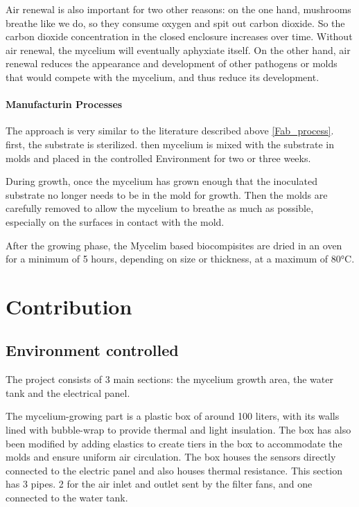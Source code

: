 Air renewal is also important for two other reasons: on the one hand, mushrooms breathe like we do, so they consume oxygen and spit out carbon dioxide. So the carbon dioxide concentration in the closed enclosure increases over time. Without air renewal, the mycelium will eventually aphyxiate itself. 
On the other hand, air renewal reduces the appearance and development of other pathogens or molds that would compete with the mycelium, and thus reduce its development. 


\paragraph[short]{Manufacturin Processes}

The approach is very similar to the literature described above \ref{Fab_process}.
first, the substrate is sterilized. then mycelium is mixed with the substrate in molds and placed in the controlled Environment for two or three weeks. 

During growth, once the mycelium has grown enough that the inoculated substrate no longer needs to be in the mold for growth. 
Then the molds are carefully removed to allow the mycelium to breathe as much as possible, especially on the surfaces in contact with the mold. 

After the growing phase, the Mycelim based biocompisites are dried in an oven for a minimum of 5 hours, depending on size or thickness, at a maximum of 80°C. 

\section{Contribution}

\subsection{Environment controlled}

The project consists of 3 main sections: the mycelium growth area, the water tank and the electrical panel.

The mycelium-growing part is a plastic box of around 100 liters, with its walls lined with bubble-wrap to provide thermal and light insulation. The box has also been modified by adding elastics to create tiers in the box to accommodate the molds and ensure uniform air circulation. The box houses the sensors directly connected to the electric panel and also houses thermal resistance. This section has 3 pipes. 2 for the air inlet and outlet sent by the filter fans, and one connected to the water tank.

